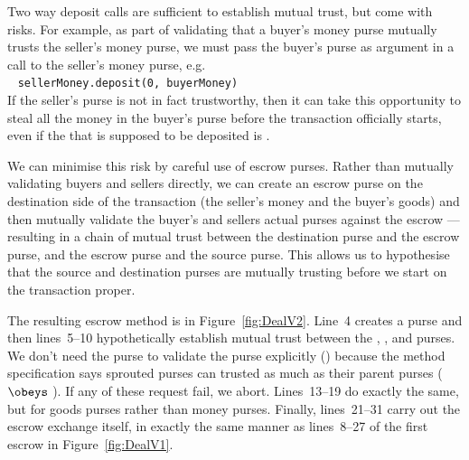 % 
%  


\label{sec:mutual-trust}

Two way deposit calls are sufficient to establish mutual trust, %
but come with risks. %
For example, as part of
validating that a buyer's money purse mutually trusts the seller's
money purse, we must  pass the buyer's purse 
as %
argument in a
 call to the seller's money purse, e.g.\\
%
~ \SP \lstinline+sellerMoney.deposit(0, buyerMoney)+\\
%
\noindent
If the seller's purse is not in fact trustworthy, then it can take this
opportunity to steal all the money in the buyer's purse before the
transaction officially starts, even if the  that is supposed
to be deposited is .

We can minimise this risk by careful use of escrow purses. Rather than
mutually validating buyers and sellers directly, we can create an escrow
purse on the destination side of the transaction (the seller's money
and the buyer's goods) and then mutually validate the buyer's and
sellers actual purses against the escrow --- resulting in a chain of
mutual trust between the destination purse and the escrow purse, and
the escrow purse and the source purse. This allows us to hypothesise
that the source and destination purses are mutually trusting before we
start on the transaction proper.

The resulting escrow method is in
Figure~\ref{fig:DealV2}. Line~4 creates a 
purse and then lines~5--10 hypothetically establish mutual trust
between the , , and 
purses.  We don't need the  purse to validate the
 purse explicitly
() because the 
method specification says sprouted purses can trusted as much as their
parent purses ( $\obeys$ ). If any of these
 request fail, we abort.
Lines~13--19 do exactly the same, but for goods purses rather than
money purses.  Finally, lines~21--31 carry out the escrow exchange
itself, in exactly the same manner as lines~8--27 of the first escrow
in Figure~\ref{fig:DealV1}.


\label{sec:VaildEscrow}

